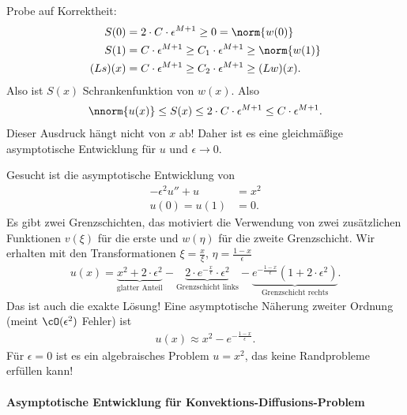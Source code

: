 Probe auf Korrektheit:
\begin{align*}
  S(0) &= 2\cdot C\cdot\epsilon^{M+1} \geq 0 = \norm{w(0)}\\
  S(1) &= C\cdot\epsilon^{M+1} \geq C_{1}\cdot \epsilon^{M+1} \geq \norm{w(1)}\\
(Ls)(x) & = C\cdot \epsilon^{M+1} \geq C_{2}\cdot \epsilon^{M+1} \geq (Lw)(x). 
\end{align*}
Also ist $S(x)$ Schrankenfunktion von $w(x)$. Also
\begin{align*}
  \nnorm{u(x)}\leq S(x) \leq 2\cdot C \cdot \epsilon^{M+1} \leq C\cdot \epsilon^{M+1}. 
\end{align*}
Dieser Ausdruck hängt nicht von $x$ ab! Daher ist es eine gleichmäßige asymptotische Entwicklung für $u$ und $\epsilon \to 0$. 

\begin{beispiel}\label{ex:4-4}
  Gesucht ist die asymptotische Entwicklung von
  \begin{align*}
    - \epsilon^{2}u'' + u &= x^{2}\\
u(0) = u(1) &= 0. 
  \end{align*}
Es gibt zwei Grenzschichten, das motiviert die Verwendung von zwei zusätzlichen Funktionen $v(\xi)$ für die erste und $w(\eta)$ für die zweite Grenzschicht. Wir erhalten mit den Transformationen $\xi = \frac x \xi$, $\eta = \frac {1 - x} \epsilon$
\begin{align*}
  u(x) = \underbrace{x^{2} + 2\cdot \epsilon^{2}}_{\text{glatter Anteil}} - \underbrace{2\cdot e^{- \frac x \epsilon}\cdot \epsilon^{2}}_{\text{Grenzschicht links}} - \underbrace{e^{- \frac {1-x} \epsilon}(1 + 2\cdot \epsilon^{2})}_{\text{Grenzschicht rechts}}. 
\end{align*}
Das ist auch die exakte Lösung! Eine asymptotische Näherung zweiter Ordnung (meint $\cO(\epsilon^{2})$ Fehler) ist
\begin{align*}
  u(x) \approx x^{2} - e^{- \frac {1-x} \epsilon}.
\end{align*}
Für $\epsilon = 0$ ist es ein algebraisches Problem $u = x^{2}$, das keine Randprobleme erfüllen kann!
\end{beispiel}

\paragraph{Asymptotische Entwicklung für Konvektions-Diffusions-Problem}
\label{sec:asympt-entw-fur-konv}




